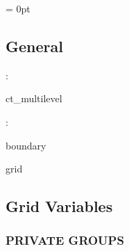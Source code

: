\parskip = 0pt

\vspace{3mm} \subsection*{General}

: 

ct\_multilevel
\vspace{2mm}

: 

boundary

grid
\vspace{2mm}
\subsection*{Grid Variables}
\vspace{5mm}\subsubsection{PRIVATE GROUPS}

\vspace{5mm}

